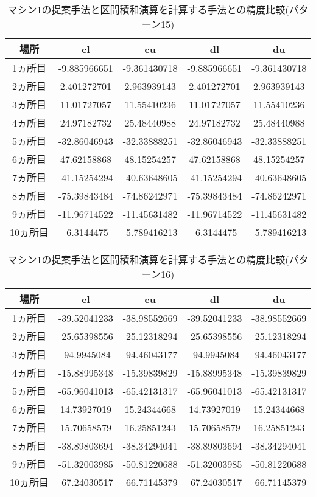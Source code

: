 \documentclass[11pt,a4paper]{jsreport}
\theoremstyle{definition}
\begin{document}
\begin{table}[H]
\centering
\begin{tabular}{|c|c|c|c|c|}
\hline
場所 & cl & cu & dl & du \\ \hline
1ヵ所目 & -9.885966651 & -9.361430718 & -9.885966651 & -9.361430718 \\ \hline
2ヵ所目 & 2.401272701 & 2.963939143 & 2.401272701 & 2.963939143 \\ \hline
3ヵ所目 & 11.01727057 & 11.55410236 & 11.01727057 & 11.55410236 \\ \hline
4ヵ所目 & 24.97182732 & 25.48440988 & 24.97182732 & 25.48440988 \\ \hline
5ヵ所目 & -32.86046943 & -32.33888251 & -32.86046943 & -32.33888251 \\ \hline
6ヵ所目 & 47.62158868 & 48.15254257 & 47.62158868 & 48.15254257 \\ \hline
7ヵ所目 & -41.15254294 & -40.63648605 & -41.15254294 & -40.63648605 \\ \hline
8ヵ所目 & -75.39843484 & -74.86242971 & -75.39843484 & -74.86242971 \\ \hline
9ヵ所目 & -11.96714522 & -11.45631482 & -11.96714522 & -11.45631482 \\ \hline
10ヵ所目 & -6.3144475 & -5.789416213 & -6.3144475 & -5.789416213 \\ \hline
\end{tabular}
\caption{マシン1の提案手法と区間積和演算を計算する手法との精度比較(パターン15)}
\end{table}

\begin{table}[H]
\centering
\begin{tabular}{|c|c|c|c|c|}
\hline
場所 & cl & cu & dl & du \\ \hline
1ヵ所目 & -39.52041233 & -38.98552669 & -39.52041233 & -38.98552669 \\ \hline
2ヵ所目 & -25.65398556 & -25.12318294 & -25.65398556 & -25.12318294 \\ \hline
3ヵ所目 & -94.9945084 & -94.46043177 & -94.9945084 & -94.46043177 \\ \hline
4ヵ所目 & -15.88995348 & -15.39839829 & -15.88995348 & -15.39839829 \\ \hline
5ヵ所目 & -65.96041013 & -65.42131317 & -65.96041013 & -65.42131317 \\ \hline
6ヵ所目 & 14.73927019 & 15.24344668 & 14.73927019 & 15.24344668 \\ \hline
7ヵ所目 & 15.70658579 & 16.25851243 & 15.70658579 & 16.25851243 \\ \hline
8ヵ所目 & -38.89803694 & -38.34294041 & -38.89803694 & -38.34294041 \\ \hline
9ヵ所目 & -51.32003985 & -50.81220688 & -51.32003985 & -50.81220688 \\ \hline
10ヵ所目 & -67.24030517 & -66.71145379 & -67.24030517 & -66.71145379 \\ \hline
\end{tabular}
\caption{マシン1の提案手法と区間積和演算を計算する手法との精度比較(パターン16)}
\end{table}
\end{document}

